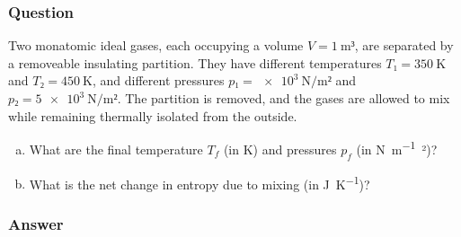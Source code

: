 \subsubsection{Question}

Two monatomic ideal gases, each occupying a volume $V = \SI{1}{\m³}$, are
separated by a removeable insulating partition. They have different
temperatures $T₁ = \SI{350}{\K}$ and $T₂ = \SI{450}{\K}$, and different
pressures $p₁ = \SI{e3}{\N\per\m²}$ and $p₂ = \SI{5e3}{\N\per\m²}$. The
partition is removed, and the gases are allowed to mix while remaining
thermally isolated from the outside.
\begin{enumerate}[(a)]
    \item
        What are the final temperature $T_f$ (in \si{\K}) and pressures $p_f$
        (in \si{\N\per\m²})?
    \item
        What is the net change in entropy due to mixing (in \si{\J\per\K})?
\end{enumerate}

\subsubsection{Answer}

